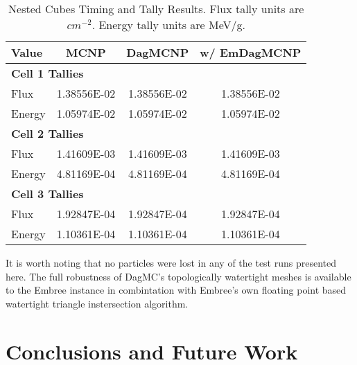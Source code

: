 \documentclass{anstrans}
\begin{document}
\begin{table}

  \begin{center}
    \caption{Nested Cubes Timing and Tally Results. Flux tally units are $cm^{-2}$. Energy tally units are MeV/g.  }
    
    \begin{tabular}{lccc}
      \toprule
      Value & MCNP & DagMCNP & w/ EmDagMCNP \\
      \toprule
      \multicolumn{4}{l}{\textbf{Cell 1 Tallies}} \\
      \hline
      Flux  & 1.38556E-02 & 1.38556E-02 & 1.38556E-02 \\
      Energy  & 1.05974E-02 & 1.05974E-02 & 1.05974E-02 \\
      \hline
      \multicolumn{4}{l}{\textbf{Cell 2 Tallies}} \\
      \hline
      Flux  & 1.41609E-03 & 1.41609E-03 & 1.41609E-03 \\
      Energy  & 4.81169E-04 & 4.81169E-04 & 4.81169E-04 \\
      \hline
      \multicolumn{4}{l}{\textbf{Cell 3 Tallies}} \\
      \hline
      Flux  & 1.92847E-04 & 1.92847E-04 & 1.92847E-04 \\
      Energy  & 1.10361E-04 & 1.10361E-04 & 1.10361E-04 \\
      \bottomrule
      
                        
    \end{tabular}


  \end{center}
\end{table}

It is worth noting that no particles were lost in any of the test runs presented here. The full robustness of DagMC's topologically watertight meshes \cite{make_watertight_smith_2010} is available to the Embree instance in combintation with Embree's own floating point based watertight triangle instersection algorithm. \cite{watertight_tri_intersection_woop_2013}

\section{Conclusions and Future Work}
\end{document}

